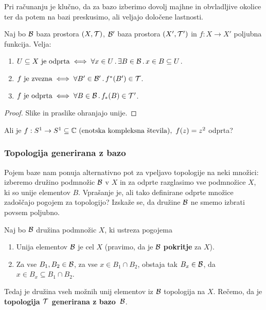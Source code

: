 Pri računanju je klučno, da za bazo izberimo dovolj majhne in obvladljive okolice ter da potem na bazi preskusimo, ali veljajo določene lastnosti.

\begin{trditev}
    Naj bo $\mathcal{B}$ baza prostora $(X, \mathcal{T})$, $\mathcal{B}'$ baza prostora $(X', \mathcal{T}')$ in $f: X \to X'$ poljubna funkcija. Velja:
    \begin{enumerate}
        \item $U \subseteq X \text{ je odprta} \iff \forall x \in U \,.\, \exists B \in \mathcal{B} \,.\, x \in B \subseteq U$.
        \item $f \text{ je zvezna} \iff \forall B' \in \mathcal{B}' \,.\, f^{*}(B') \in \mathcal{T}$.
        \item $f \text{ je odprta} \iff \forall B \in \mathcal{B} \,.\, f_{*}(B) \in \mathcal{T}'$.
    \end{enumerate}
\end{trditev}

\begin{proof}
    Slike in praslike ohranjajo unije.
\end{proof}

\begin{primer}
    Ali je $f: S^1 \to S^1 \subseteq \mathbb{C} \text{ (enotska kompleksna števila)}, \ f(z) = z^2$ odprta?
\end{primer}

\subsubsection{Topologija generirana z bazo}

Pojem baze nam ponuja alternativno pot za vpeljavo topologije na neki množici: izberemo družino podmnožic $\mathcal{B}$ v $X$ in za odprte razglasimo vse podmnožice $X$, ki so unije elementov $B$. Vprašanje je, ali tako definirane odprte množice zadoščajo pogojem za topologijo? Izskaže se, da družine $\mathcal{B}$ ne smemo izbrati povsem poljubno.

\begin{trditev}
    \label{trd:baza}
    Naj bo $\mathcal{B}$ družina podmnožic $X$, ki ustreza pogojema
    \begin{enumerate}
        \item Unija elementov $\mathcal{B}$ je cel $X$ (pravimo, da je $\mathcal{B}$ \textbf{pokritje} za $X$).
        \item Za vse $B_1, B_2 \in \mathcal{B}$, za vse $x \in B_1 \cap B_2$, obstaja tak $B_x \in \mathcal{B}$, da $x \in B_x \subseteq B_1 \cap B_2$.
    \end{enumerate} 
    Tedaj je družina vseh možnih unij elementov iz $\mathcal{B}$ topologija na $X$.     
    Rečemo, da je \textbf{topologija $\mathcal{T}$ generirana z bazo~$\mathcal{B}$}.
\end{trditev}

